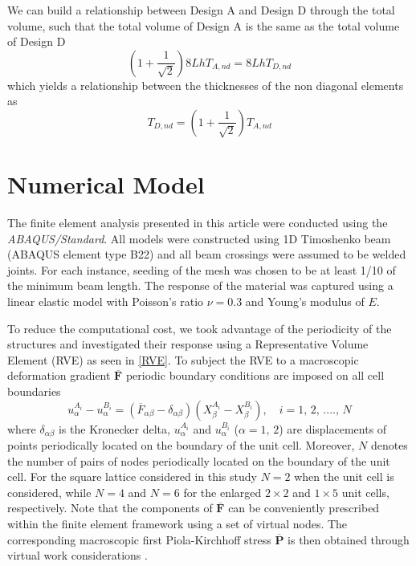 \documentclass[10pt,twoside]{fernandes_supp}
\begin{document}
We can build a relationship between Design A and Design D through the total volume, such that the total volume of Design A is the same as the total volume of Design D
\begin{equation}
\left(1+\frac{1}{\sqrt{2}}\right)8LhT_{A,nd}=8LhT_{D,nd}
\end{equation}
which yields a relationship between the thicknesses of the non diagonal elements as
\begin{equation}
	T_{D,nd}=\left(1+\frac{1}{\sqrt{2}}\right)T_{A,nd}
\end{equation}

\section{Numerical Model}
The finite element analysis presented in this article were conducted using the {\it ABAQUS/Standard}. All models were constructed using 1D Timoshenko beam  (ABAQUS element type B22) and all beam crossings were assumed to be welded joints. For each instance, seeding of the mesh was chosen to be at least 1/10 of the minimum beam length. The response of the material was captured using a linear elastic model with  Poisson's ratio $\nu=0.3$ and  Young's modulus of $E$.


To reduce the computational cost, we took advantage of the periodicity of the structures and investigated their response  using  a Representative Volume Element (RVE) as seen in \cref{RVE}.
To subject the RVE to a macroscopic deformation gradient $\overline{\mathbf{F}}$ periodic boundary conditions are imposed on all cell boundaries  \citep{danielsson2002, bertoldi2008}
\begin{equation} \label{EQN:DefInfPeriodicFEM}
    u_\alpha^{A_i} -u_\alpha^{B_i} = (\overline{F}_{\alpha\beta}-\delta_{\alpha\beta})(X_\beta^{A_i}-X_\beta^{B_i}), \quad i=1,\,2,\,....,\,N
\end{equation}
where $\delta_{\alpha\beta}$ is the Kronecker delta, $u_\alpha^{A_i}$  and $u_\alpha^{B_i}$ ($\alpha=1,\,2$) are displacements of points periodically located on the boundary of the unit cell. Moreover, $N$ denotes the number of pairs of nodes periodically located on the boundary of the unit cell. For the square lattice considered in this study $N=2$ when the unit cell is considered, while $N=4$ and $N=6$ for the enlarged $2\times2$ and $1\times5$ unit cells, respectively. Note that  the components of $\overline{\mathbf{F}}$ can be conveniently prescribed within the finite element framework using a set of virtual nodes. The corresponding  macroscopic first Piola-Kirchhoff stress $\overline{\mathbf{P}}$ is then obtained through virtual work considerations \citep{danielsson2002, bertoldi2008}. 
\end{document}
